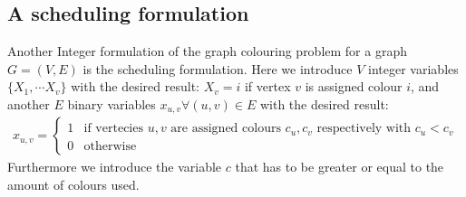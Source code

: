 \subsection{A scheduling formulation}
Another Integer formulation of the graph colouring problem for a graph $G=(V,E)$ is the scheduling formulation. Here we introduce $V$ integer variables $\{X_1, \cdots X_v\}$ with the desired result: $X_v = i$ if vertex $v$ is assigned colour $i$, and another $E$ binary variables $x_{u,v} \forall (u,v)\in E$ with the desired result:
\begin{align}
x_{u,v} = \left\{
\begin{array}{ll}
1 & \text{if vertecies }u,v \text{ are assigned colours $c_u,c_v$ respectively with } c_u < c_v \\ 0 & \text{otherwise}
\end{array}\right.
\end{align}
Furthermore we introduce the variable $c$ that has to be greater or equal to the amount of colours used.
